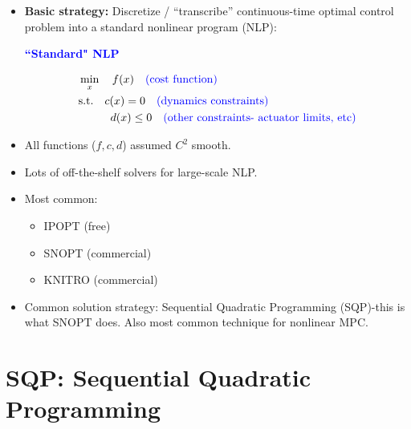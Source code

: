 \documentclass[11pt]{article}
\begin{document}
\begin{itemize}
    \item \textbf{Basic strategy:} Discretize / ``transcribe'' continuous-time optimal control problem into a standard nonlinear program (NLP):

    \textcolor{blue}{\textbf{``Standard" NLP}}
    
    \begin{equation*}
        \begin{aligned}
            &\min_{x} \quad f(x) \quad \textcolor{blue}{\text{(cost function)}} \\
            &\text{s.t.} \quad c(x) = 0 \quad \textcolor{blue}{\text{(dynamics constraints)}} \\
            &\hspace{10mm} d(x) \leq 0 \quad \textcolor{blue}{\text{(other constraints- actuator limits, etc)}}
        \end{aligned}
    \end{equation*}

    \item All functions ($f,c,d$) assumed $C^2$ smooth.
    \item Lots of off-the-shelf solvers for large-scale NLP.
    \item Most common:
    \begin{itemize}
        \item IPOPT (free)
        \item SNOPT (commercial)
        \item KNITRO (commercial)
    \end{itemize}
    \item Common solution strategy: Sequential Quadratic Programming (SQP)-this is what SNOPT does. Also most common technique for nonlinear MPC.
\end{itemize}

\section*{SQP: Sequential Quadratic Programming}
\end{document}
